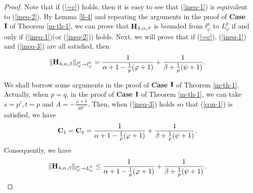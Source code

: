 \documentclass[10pt]{amsart}
\theoremstyle{definition}    %
\numberwithin{equation}{section}
\begin{document}
\begin{proof}Note that if (\ref{=c}) holds, then it is easy to see that (\ref{ineq-1}) is equivalent to (\ref{ineq-2}). By Lemma \ref{ll-4} and repeating the arguments in the proof of {\bf Case ${\bf I}$} of Theorem \ref{m-th-1}, we can prove that ${\bf H}_{\lambda, \alpha, \beta}$ is bounded from $l_{\varphi}^{p}$ to $L_{\psi}^{p}$ if and only if (\ref{ineq-1})(or (\ref{ineq-2})) holds. Next, we will prove that if (\ref{=c}), (\ref{ineq-1}) and (\ref{ineq-3}) are all satisfied, then  
 $$\|{\bf H}_{\lambda, \alpha, \beta}\|_{l_{\varphi}^{p}\rightarrow l_{\psi}^p}=\frac{1}{\alpha+1-\frac{1}{p}(\varphi+1)}+\frac{1}{\beta+\frac{1}{p}(\psi+1)}.$$ 
 

We shall borrow some arguments in the proof of {\bf Case ${\bf I}$} of Theorem \ref{m-th-1}. Actually, when $p=q$, in the proof of {\bf Case ${\bf I}$} of Theorem \ref{m-th-1}, we can take $s=p', t=p$ and $A=-\frac{\varphi+1}{pp'}$. Then, when (\ref{ineq-3}) holds so that (\ref{con-1}) is satisfied, we have
$${\bf C}_1={\bf C}_2=\frac{1}{\alpha+1-\frac{1}{p}(\varphi+1)}+\frac{1}{\beta+\frac{1}{p}(\psi+1)}.$$
Consequently, we have $$\|{\bf H}_{\lambda, \alpha, \beta}\|_{l_{\varphi}^{p}\rightarrow L_{\psi}^p}\leq \frac{1}{\alpha+1-\frac{1}{p}(\varphi+1)}+\frac{1}{\beta+\frac{1}{p}(\psi+1)}.$$


\end{proof}
\end{document}
